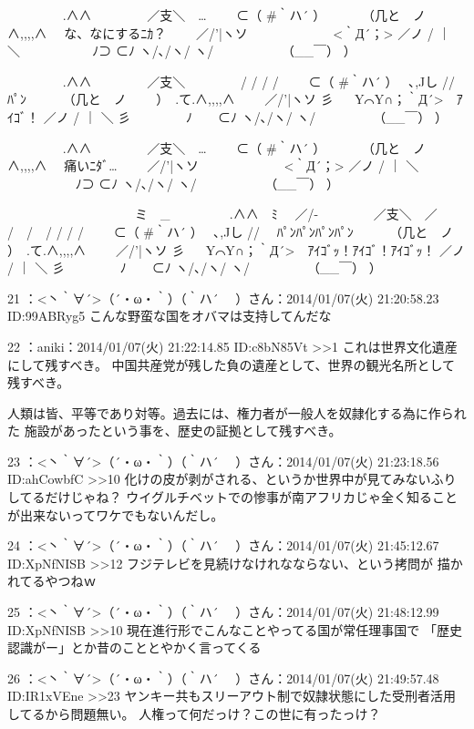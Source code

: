     　　　　 .∧∧
    　　　　／支＼　…
    　　⊂（ #｀ハ´ ）
    　　　（几と　ノ　 　　　　 ∧,,,,∧　 な、なにするﾆｶ？
    　　／/'|ヽソ 　　　　 　　<｀Д´；>
    ／ノ / ｜ ＼ 　　　　 　ﾉ⊃ ⊂ﾉ
    ヽ/､/ヽ/ ヽ/　　　　　 （__￣） ）


    　　　　 .∧∧
    　　　　／支＼　　 　　/ / / /
    　　⊂（ #｀ハ´ ）　 ､,Jし //　 ﾊﾟﾝ
    　　　（几と　ノ　 　）　.て.∧,,,,∧
    　　／/'|ヽソ 彡 　 Y⌒Y∩；｀Д´>　ｱｲｺﾞ！
    ／ノ / ｜ ＼ 彡　　　 　ﾉ　　⊂ﾉ
    ヽ/､/ヽ/ ヽ/　　　　　（__￣） ）


    　　　　 .∧∧
    　　　　／支＼　…
    　　⊂（ #｀ハ´ ）
    　　　（几と　ノ　 　　　　 ∧,,,,∧　 痛いﾆﾀﾞ…
    　　／/'|ヽソ 　　　　 　　<｀Д´；>
    ／ノ / ｜ ＼ 　　　　 　ﾉ⊃ ⊂ﾉ
    ヽ/､/ヽ/ ヽ/　　　　　 （__￣） ）

    　　　　　　　　　　ミ　_
    　　　　 .∧∧　ﾐ　 ／/-
    　　　　／支＼　／ /　/　/ / / /
    　　⊂（ #｀ハ´ ）　 ､,Jし //　 ﾊﾟﾝﾊﾟﾝﾊﾟﾝﾊﾟﾝ
    　　　（几と　ノ　 　）　.て.∧,,,,∧
    　　／/'|ヽソ 彡 　 Y⌒Y∩；｀Д´>　ｱｲｺﾞｯ！ｱｲｺﾞ！ｱｲｺﾞｯ！
    ／ノ / ｜ ＼ 彡　　　 　ﾉ　　⊂ﾉ
    ヽ/､/ヽ/ ヽ/　　　　　（__￣） ）

21 ：<丶｀∀´>（´・ω・｀）（｀ハ´　 ）さん：2014/01/07(火) 21:20:58.23 ID:99ABRyg5
    こんな野蛮な国をオバマは支持してんだな

22 ：aniki：2014/01/07(火) 21:22:14.85 ID:c8bN85Vt
    >>1
    これは世界文化遺産にして残すべき。
    中国共産党が残した負の遺産として、世界の観光名所として残すべき。

    人類は皆、平等であり対等。過去には、権力者が一般人を奴隷化する為に作られた
    施設があったという事を、歴史の証拠として残すべき。

23 ：<丶｀∀´>（´・ω・｀）（｀ハ´　 ）さん：2014/01/07(火) 21:23:18.56 ID:ahCowbfC
    >>10
    化けの皮が剥がされる、というか世界中が見てみないふりしてるだけじゃね？
    ウイグルチベットでの惨事が南アフリカじゃ全く知ることが出来ないってワケでもないんだし。

24 ：<丶｀∀´>（´・ω・｀）（｀ハ´　 ）さん：2014/01/07(火) 21:45:12.67 ID:XpNfNISB
    >>12
    フジテレビを見続けなけれなならない、という拷問が
    描かれてるやつねｗ

25 ：<丶｀∀´>（´・ω・｀）（｀ハ´　 ）さん：2014/01/07(火) 21:48:12.99 ID:XpNfNISB
    >>10
    現在進行形でこんなことやってる国が常任理事国で
    「歴史認識がー」とか昔のこととやかく言ってくる

26 ：<丶｀∀´>（´・ω・｀）（｀ハ´　 ）さん：2014/01/07(火) 21:49:57.48 ID:IR1xVEne
    >>23
    ヤンキー共もスリーアウト制で奴隷状態にした受刑者活用してるから問題無い。
    人権って何だっけ？この世に有ったっけ？

